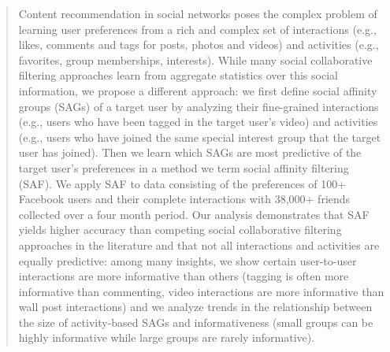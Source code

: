 \begin{quote}
Content recommendation in social networks poses the complex problem of
learning user preferences from a rich and complex set of interactions
(e.g., likes, comments and tags for posts, photos and videos) and
activities (e.g., favorites, group memberships, interests).  While
many social collaborative filtering approaches learn from aggregate statistics over this
social information, we propose a different approach: we first define
social affinity groups (SAGs) of a target user by analyzing their
fine-grained interactions (e.g., users who have been tagged in the
target user's video) and activities (e.g., users who have joined the
same special interest group that the target user has joined).  Then we
learn which SAGs are most predictive of the target user's preferences
in a method we term social affinity filtering (SAF).  We apply SAF to
data consisting of the preferences of 100+ Facebook users and their
complete interactions with 38,000+ friends collected over a four month
period.  Our analysis demonstrates that SAF yields higher accuracy
than competing social collaborative filtering approaches in the literature and that not all
interactions and activities are equally predictive: among many
insights, we show certain user-to-user interactions are more
informative than others (tagging is often more informative than
commenting, video interactions are more informative than wall post
interactions) and we analyze trends in the relationship between the
size of activity-based SAGs and informativeness (small groups can be
highly informative while large groups are rarely informative).
\end{quote}
